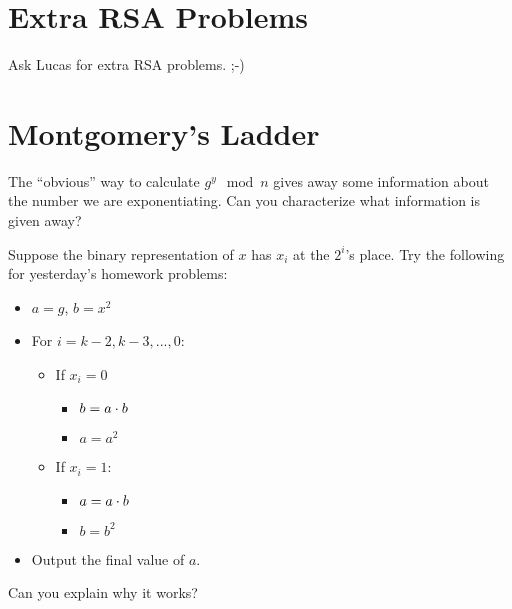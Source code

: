 \documentclass[12pt]{article}
\begin{document}
\section{Extra RSA Problems}

Ask Lucas for extra RSA problems. ;-)


\section{Montgomery's Ladder}

The ``obvious'' way to calculate $g^y \mod n$ gives away some information about the number we are exponentiating. Can you characterize what information is given away?

Suppose the binary representation of $x$ has $x_i$ at the $2^i$'s place. Try the following for yesterday's homework problems:


\begin{itemize}
\item $a = g$, $b=x^2$
\item For $i = k-2, k-3, ..., 0$:
\begin{itemize}
\item If $x_i = 0$
\begin{itemize}
\item $b = a \cdot b$
\item $a = a^2$
\end{itemize}
\item If $x_i = 1$:
\begin{itemize}
\item $a = a \cdot b$
\item $b = b^2$
\end{itemize}
\end{itemize}
\item Output the final value of $a$.
\end{itemize}

Can you explain why it works?
\end{document}
